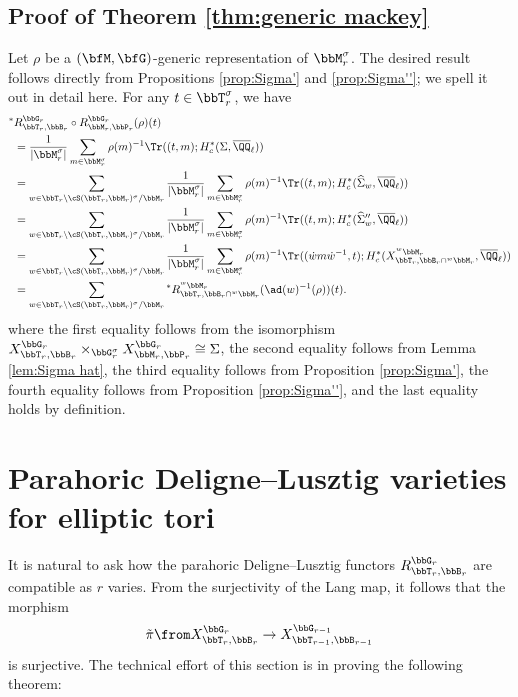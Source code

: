   
  \subsection{Proof of Theorem \ref{thm:generic mackey}}\label{subsec:generic mackey proof}

  Let $\rho$ be a $(\bfM,\bfG)$-generic representation of $\bbM_r^\sigma$. The desired result follows directly from Propositions \ref{prop:Sigma'} and \ref{prop:Sigma''}; we spell it out in detail here. For any $t \in \bbT_r^\sigma$, we have
  \begin{align*}
    {}^* {}&{}R_{\bbT_r,\bbB_r}^{\bbG_r} \circ R_{\bbM_r,\bbP_r}^{\bbG_r}(\rho)(t) \\
    &= \frac{1}{|\bbM_r^\sigma|} \sum_{m \in \bbM_r^\sigma} \rho(m)^{-1} \Tr((t,m); H_c^*(\Sigma, \overline \QQ_\ell)) \\
    &= \sum_{w \in \bbT_r \backslash \cS(\bbT_r, \bbM_r)^\sigma / \bbM_r} \frac{1}{|\bbM_r^\sigma|} \sum_{m \in \bbM_r^\sigma} \rho(m)^{-1} \Tr((t,m); H_c^*(\widehat \Sigma_w, \overline \QQ_\ell)) \\
    &= \sum_{w \in \bbT_r \backslash \cS(\bbT_r, \bbM_r)^\sigma / \bbM_r} \frac{1}{|\bbM_r^\sigma|} \sum_{m \in \bbM_r^\sigma} \rho(m)^{-1} \Tr((t,m); H_c^*(\widehat \Sigma_w'', \overline \QQ_\ell)) \\
    &= \sum_{w \in \bbT_r \backslash \cS(\bbT_r, \bbM_r)^\sigma / \bbM_r} \frac{1}{|\bbM_r^\sigma|} \sum_{m \in \bbM_r^\sigma} \rho(m)^{-1} \Tr((\dot w m \dot w^{-1},t); H_c^*(X_{\bbT_r, \bbB_r \cap {}^w \bbM_r}^{{}^w \bbM_r}, \overline \QQ_\ell)) \\
    &= \sum_{w \in \bbT_r \backslash \cS(\bbT_r, \bbM_r)^\sigma / \bbM_r} {}^* R_{\bbT_r, \bbB_r \cap {}^w \bbM_r}^{{}^w \bbM_r}(\ad(w)^{-1}(\rho))(t).
  \end{align*}
  where the first equality follows from the isomorphism $X_{\bbT_r,\bbB_r}^{\bbG_r} \times_{\bbG_r^\sigma} X_{\bbM_r,\bbP_r}^{\bbG_r} \cong \Sigma$, the second equality follows from Lemma \ref{lem:Sigma hat}, the third equality follows from Proposition \ref{prop:Sigma'}, the fourth equality follows from Proposition \ref{prop:Sigma''}, and the last equality holds by definition.

  
\section{Parahoric Deligne--Lusztig varieties for elliptic tori}\label{sec:depth compatibility}

It is natural to ask how the parahoric Deligne--Lusztig functors $R_{\bbT_r,\bbB_r}^{\bbG_r}$ are compatible as $r$ varies. From the surjectivity of the Lang map, it follows that the morphism
\begin{equation*}
  \tilde \pi \from X_{\bbT_r,\bbB_r}^{\bbG_r} \to X_{\bbT_{r-1},\bbB_{r-1}}^{\bbG_{r-1}}
\end{equation*}
is surjective. The technical effort of this section is in proving the following theorem:

